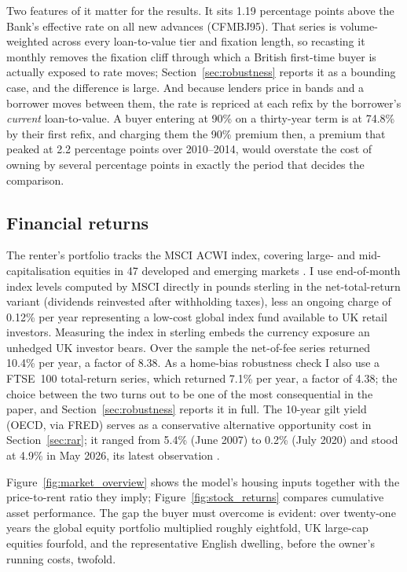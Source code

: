 Two features of it matter for the results. It sits 1.19 percentage points above the Bank's effective rate on all new advances (CFMBJ95). That series is volume-weighted across every loan-to-value tier and fixation length, so recasting it monthly removes the fixation cliff through which a British first-time buyer is actually exposed to rate moves; Section~\ref{sec:robustness} reports it as a bounding case, and the difference is large. And because lenders price in bands and a borrower moves between them, the rate is repriced at each refix by the borrower's \emph{current} loan-to-value. A buyer entering at 90\% on a thirty-year term is at 74.8\% by their first refix, and charging them the 90\% premium then, a premium that peaked at 2.2 percentage points over 2010--2014, would overstate the cost of owning by several percentage points in exactly the period that decides the comparison.

\subsection{Financial returns}

The renter's portfolio tracks the MSCI ACWI index, covering large- and mid-capitalisation equities in 47 developed and emerging markets \parencite{msci_acwi}. I use end-of-month index levels computed by MSCI directly in pounds sterling in the net-total-return variant (dividends reinvested after withholding taxes), less an ongoing charge of 0.12\% per year representing a low-cost global index fund available to UK retail investors. Measuring the index in sterling embeds the currency exposure an unhedged UK investor bears. Over the sample the net-of-fee series returned 10.4\% per year, a factor of 8.38. As a home-bias robustness check I also use a FTSE~100 total-return series, which returned 7.1\% per year, a factor of 4.38; the choice between the two turns out to be one of the most consequential in the paper, and Section~\ref{sec:robustness} reports it in full. The 10-year gilt yield (OECD, via FRED) serves as a conservative alternative opportunity cost in Section~\ref{sec:rar}; it ranged from 5.4\% (June 2007) to 0.2\% (July 2020) and stood at 4.9\% in May 2026, its latest observation \parencite{fred_uk_gilts}.

Figure~\ref{fig:market_overview} shows the model's housing inputs together with the price-to-rent ratio they imply; Figure~\ref{fig:stock_returns} compares cumulative asset performance. The gap the buyer must overcome is evident: over twenty-one years the global equity portfolio multiplied roughly eightfold, UK large-cap equities fourfold, and the representative English dwelling, before the owner's running costs, twofold.

